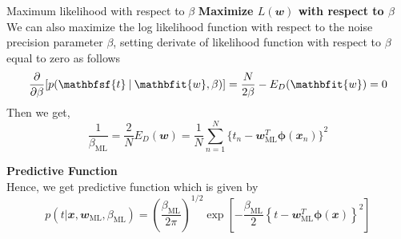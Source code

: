 \documentclass{bredelebeamer}
\begin{document}
\begin{frame}{Maximum likelihood with respect to $\beta$}
  \textbf{Maximize $L(\mathbfit{w})$ with respect to $\beta$}\\
  We can also maximize the log likelihood function with respect to the
  noise precision parameter $\beta$, setting derivate of likelihood function
  with respect to $\beta$ equal to zero as follows
  \begin{equation}
    \frac{\partial}{\partial\beta} [p(\mathbfsf{t} \:|\: \mathbfit{w}, \beta)]
    = \frac{N}{2\beta} - E_{D}(\mathbfit{w}) = 0
  \end{equation}
  Then we get,
  \begin{equation}
    \frac{1}{\beta_{\textrm{ML}}} = \frac{2}{N}E_{D}(\mathbfit{w})
     = \frac{1}{N} \sum_{n=1}^{N}{\{t_n - \mathbfit{w}_{\textrm{ML}}^T \boldsymbol{\phi} (\mathbfit{x}_n)\}}^2
  \end{equation}

  \vspace{0.5\baselineskip}
  \textbf{Predictive Function}\\
  Hence, we get predictive function which is given by
  \begin{equation}
    p(t|\mathbfit{x}, \mathbfit{w}_{\mathrm{ML}}, \beta_{\mathrm{ML}})
    = \left({\frac{\beta_{\mathrm{ML}}}{2\pi}}\right)^{1/2}
    \exp{\left[
      -\frac{\beta_{\mathrm{ML}}}{2}
      \left\{
        {t - \mathbfit{w}_{\mathrm{ML}}^T \boldsymbol{\phi}(\mathbfit{x})}
      \right\}^2
    \right]}
  \end{equation}
\end{frame}
\end{document}

